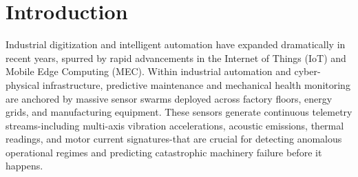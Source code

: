 \documentclass[12pt,a4paper]{report}
\begin{document}
\hypersetup{pageanchor=false}



\hypersetup{pageanchor=true}





\thispagestyle{empty}
\newpage

\tableofcontents
\listoffigures
\listoftables



\cleardoublepage
\setcounter{page}{1}

\pagestyle{fancy}
\fancyhf{}
\fancyfoot[C]{\thepage}
\renewcommand{\headrulewidth}{0.4pt}
\renewcommand{\footrulewidth}{0pt}


\chapter[Introduction]{\Huge Introduction}

Industrial digitization and intelligent automation have expanded dramatically in recent years, spurred by rapid advancements in the Internet of Things (IoT) and Mobile Edge Computing (MEC). Within industrial automation and cyber-physical infrastructure, predictive maintenance and mechanical health monitoring are anchored by massive sensor swarms deployed across factory floors, energy grids, and manufacturing equipment. These sensors generate continuous telemetry streams-including multi-axis vibration accelerations, acoustic emissions, thermal readings, and motor current signatures-that are crucial for detecting anomalous operational regimes and predicting catastrophic machinery failure before it happens.
\end{document}
